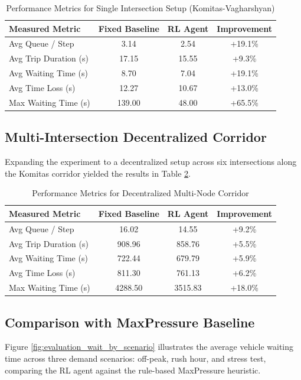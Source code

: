 \documentclass[conference]{IEEEtran}
\begin{document}
\begin{table}[htbp]
\centering
\caption{Performance Metrics for Single Intersection Setup (Komitas-Vagharshyan)}
\begin{tabular}{@{}l c c c@{}}
\toprule
\textbf{Measured Metric} & \textbf{Fixed Baseline} & \textbf{RL Agent} & \textbf{Improvement} \\
\midrule
  Avg Queue / Step           & 3.14   & 2.54  & +19.1\% \\
  Avg Trip Duration (s)      & 17.15  & 15.55 & +9.3\%  \\
  Avg Waiting Time (s)       & 8.70   & 7.04  & +19.1\% \\
  Avg Time Loss (s)          & 12.27  & 10.67 & +13.0\% \\
  Max Waiting Time (s)       & 139.00 & 48.00 & +65.5\% \\
\bottomrule
\end{tabular}
\label{tab:single_node}
\end{table}

\subsection{Multi-Intersection Decentralized Corridor}
Expanding the experiment to a decentralized setup across six intersections along the Komitas corridor yielded the results in Table \ref{tab:multi_node}.

\begin{table}[htbp]
\centering
\caption{Performance Metrics for Decentralized Multi-Node Corridor}
\begin{tabular}{@{}l c c c@{}}
\toprule
\textbf{Measured Metric} & \textbf{Fixed Baseline} & \textbf{RL Agent} & \textbf{Improvement} \\
\midrule
Avg Queue / Step          & 16.02   & 14.55   & +9.2\%  \\
Avg Trip Duration (s)     & 908.96  & 858.76  & +5.5\%  \\
Avg Waiting Time (s)      & 722.44  & 679.79  & +5.9\%  \\
Avg Time Loss (s)         & 811.30  & 761.13  & +6.2\%  \\
Max Waiting Time (s)      & 4288.50 & 3515.83 & +18.0\% \\
\bottomrule
\end{tabular}
\label{tab:multi_node}
\end{table}

\subsection{Comparison with MaxPressure Baseline}
Figure \ref{fig:evaluation_wait_by_scenario} illustrates the average vehicle waiting time across three demand scenarios: off-peak, rush hour, and stress test, comparing the RL agent against the rule-based MaxPressure heuristic.
\end{document}
